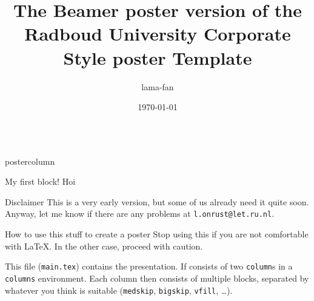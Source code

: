 \documentclass[roundedcorners=true, titleposition=left]{beamerSEG2021poster}
\institute[CLS]{Centre for Language Studies, Radboud University Nijmegen, Nijmegen, the Netherlands}
\title{The Beamer poster version of the Radboud University Corporate Style poster Template}
\date{\today}
\author{lama-fan}
\begin{document}
\begin{frame}
\begin{columns}
\begin{column}{0.19\textwidth}
\begin{beamercolorbox}[center, wd=\textwidth]{postercolumn}
\begin{minipage}[T]{0.95\textwidth}
\parbox[t][\columnheight]{\textwidth}{%
  \begin{block}{My first block!}
  	Hoi
  \end{block}
  \medskip
  \begin{block}{Disclaimer}
  	This is a very early version, but some of us already need it quite soon. Anyway, let me know if there are any problems at \texttt{l.onrust@let.ru.nl}.
  \end{block}
 	\medskip
    \begin{block}{How to use this stuff to create a poster}
    	Stop using this if you are not comfortable with \LaTeX. In the other case, proceed with caution.
        
        This file (\texttt{main.tex}) contains the presentation. If consists of two \texttt{column}s in a \texttt{columns} environment. Each column then consists of multiple blocks, separated by whatever you think is suitable (\texttt{medskip}, \texttt{bigskip}, \texttt{vfill}, \ldots). 
    \end{block}
}
\end{minipage}
\end{beamercolorbox}
\end{column}


\end{columns}
\end{frame}
\end{document}
